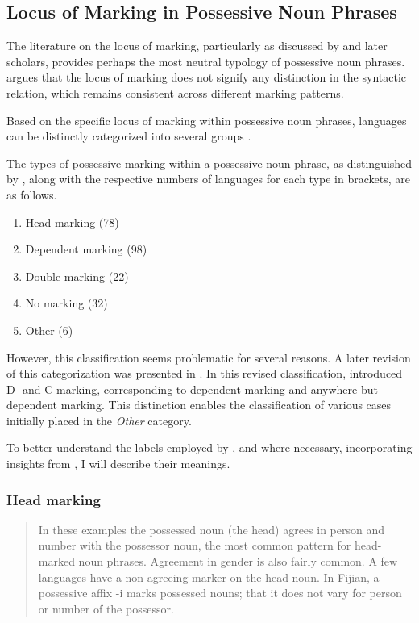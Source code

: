 \subsection{Locus of Marking in Possessive Noun Phrases}

The literature on the locus of marking, particularly as discussed by \cite{nichols1986head} and later scholars, provides perhaps the most neutral typology of possessive noun phrases. \cite[57]{nichols1986head} argues that the locus of marking does not signify any distinction in the syntactic relation, which remains consistent across different marking patterns.

Based on the specific locus of marking within possessive noun phrases, languages can be distinctly categorized into several groups \citep{nichols_locus_2013, van2016locus, van2016grammaticalization, lander2020head}.

The types of possessive marking within a possessive noun phrase, as distinguished by \cite{nichols_locus_2013}, along with the respective numbers of languages for each type in brackets, are as follows.

\begin{enumerate}
    \item Head marking (78)
    \item Dependent marking (98)
    \item Double marking (22)
    \item No marking (32)
    \item Other (6)
\end{enumerate}

However, this classification seems problematic for several reasons. A later revision of this categorization was presented in \cite{lander2020head}. In this revised classification, \cite{lander2020head} introduced D- and C-marking, corresponding to dependent marking and anywhere-but-dependent marking. This distinction enables the classification of various cases initially placed in the \textit{Other} category.

To better understand the labels employed by \cite{nichols_locus_2013}, and where necessary, incorporating insights from \cite{lander2020head}, I will describe their meanings.

\subsubsection{Head marking}

\begin{quote}
    In these examples the possessed noun (the head) agrees in person and number with the possessor noun, the most common pattern for head-marked noun phrases. Agreement in gender is also fairly common. A few languages have a non-agreeing marker on the head noun. In Fijian, a possessive affix -i marks possessed nouns; that it does not vary for person or number of the possessor. \citep{nichols_locus_2013}
\end{quote}


